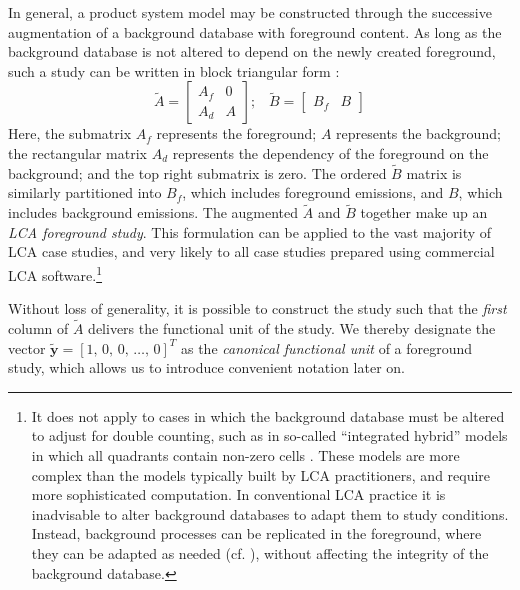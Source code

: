 In general, a product system model may be constructed through the successive augmentation of a background database with foreground content.  As long as the background database is not altered to depend on the newly created foreground, such a study can be written in block triangular form \citep{Kuczenski_JLCA_2015}:
\begin{equation}
\tilde{A} = \left[\begin{array}{cc}
A_f & 0 \\
A_d &  A
  \end{array}
\right];\;\;\;
  \tilde{B} = \left[\begin{array}{cc} B_f & B   \end{array}\right]
\label{eqn:foreground}
\end{equation}
Here, the submatrix $A_f$ represents the foreground; $A$ represents the background; the rectangular matrix $A_d$ represents the dependency of the foreground on the background; and the top right submatrix is zero.  The ordered $\tilde{B}$ matrix is similarly partitioned into $B_f$, which includes foreground emissions, and $B$, which includes background emissions. %
The augmented $\tilde{A}$ and $\tilde{B}$ together make up an \emph{LCA foreground study}.  This formulation can be applied to the vast majority of LCA case studies, and very likely to all case studies prepared using commercial LCA software.\footnote{It does not apply to cases in which the background database must be altered to adjust for double counting, such as in so-called ``integrated hybrid'' models in which all quadrants contain non-zero cells \citep{Suh2004}.  These models are more complex than the models typically built by LCA practitioners, and require more sophisticated computation.  In conventional LCA practice it is inadvisable to alter background databases to adapt them to study conditions.  Instead, background processes can be replicated in the foreground, where they can be adapted as needed (cf. \cite{Bourgault_JLCA_2013}), without affecting the integrity of the background database.}

Without loss of generality, it is possible to construct the study such that the \textit{first} column of $\tilde{A}$ delivers the functional unit of the study.  We thereby designate the vector $\tilde{\mathbf{y}} =  [ 1,\, 0,\, 0 ,\,\ldots,\, 0]^{T}$ as the \textit{canonical functional unit} of a foreground study, which allows us to introduce convenient notation later on.  

